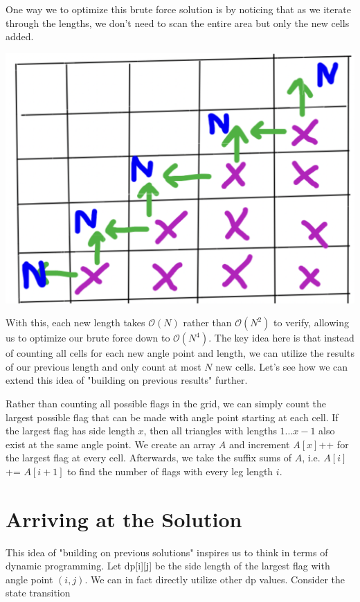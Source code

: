 \documentclass[15pt]{article}
\begin{document}
One way we to optimize this brute force solution is by noticing that as we iterate through the lengths, we don't need to scan the entire area but only the new cells added. 

\includegraphics[width=1\textwidth]{bluenew.png}

With this, each new length takes $\mathcal{O}(N)$ rather than $\mathcal{O}(N^2)$ to verify, allowing us to optimize our brute force down to $\mathcal{O}(N^4)$. The key idea here is that instead of counting all cells for each new angle point and length, we can utilize the results of our previous length and only count at most $N$ new cells. Let's see how we can extend this idea of "building on previous results" further.

Rather than counting all possible flags in the grid, we can simply count the largest possible flag that can be made with angle point starting at each cell. If the largest flag has side length $x$, then all triangles with lengths $1...x-1$ also exist at the same angle point. We create an array $A$ and increment $A[x]$++ for the largest flag at every cell. Afterwards, we take the suffix sums of $A$, i.e. $A[i]$ += $A[i+1]$ to find the number of flags with every leg length $i$.

\section{Arriving at the Solution}

This idea of "building on previous solutions" inspires us to think in terms of dynamic programming. Let dp[i][j] be the side length of the largest flag with angle point $(i, j)$. We can in fact directly utilize other dp values. Consider the state transition
\end{document}
